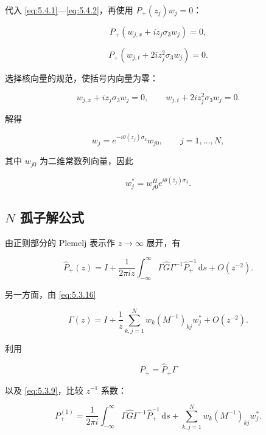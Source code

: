 \documentclass[
    lang=cn,
    scheme=chinese,
    mode=simple,
    device=normal,
    color=blue,
    math=cm,
    thmcnt=section,
    12pt,
    nowatermark
]{elegantbook}
\begin{document}
代入 \eqref{eq:5.4.1}---\eqref{eq:5.4.2}，再使用 $P_+(z_j)w_j=0$：

\[
    P_+\left(w_{j,x}+iz_j\sigma_3w_j\right)=0,
\]

\[
    P_+\left(w_{j,t}+2iz_j^2\sigma_3w_j\right)=0.
\]

选择核向量的规范，使括号内向量为零：

\[
    w_{j,x}+iz_j\sigma_3w_j=0,
    \qquad
    w_{j,t}+2iz_j^2\sigma_3w_j=0.
\]

解得

\begin{equation}
    w_j
    =
    e^{-i\theta(z_j)\sigma_3}w_{j0},
    \qquad
    j=1,\ldots,N,
    \tag{5.4.5}
    \label{eq:5.4.5}
\end{equation}

其中 $w_{j0}$ 为二维常数列向量，因此

\begin{equation}
    w_j^*
    =
    w_{j0}^He^{i\theta(\bar z_j)\sigma_3}.
    \tag{5.4.6}
    \label{eq:5.4.6}
\end{equation}

\subsection{\texorpdfstring{$N$}{N} 孤子解公式}

由正则部分的 Plemelj 表示作 $z\to\infty$ 展开，有

\begin{equation}
    \widehat P_+(z)
    =
    I+
    \dfrac{1}{2\pi iz}
    \int_{-\infty}^{\infty}
    \Gamma\widehat G\Gamma^{-1}\widehat P_+^{-1}\,\mathrm ds
    +
    O(z^{-2}).
    \tag{5.4.7}
    \label{eq:5.4.7}
\end{equation}

另一方面，由 \eqref{eq:5.3.16}

\begin{equation}
    \Gamma(z)
    =
    I+
    \dfrac{1}{z}
    \sum\limits_{k,j=1}^{N}
    w_k(M^{-1})_{kj}w_j^*
    +
    O(z^{-2}).
    \tag{5.4.8}
    \label{eq:5.4.8}
\end{equation}

利用

\[
    P_+=\widehat P_+\Gamma
\]

以及 \eqref{eq:5.3.9}，比较 $z^{-1}$ 系数：

\begin{equation}
    P_+^{(1)}
    =
    \dfrac{1}{2\pi i}
    \int_{-\infty}^{\infty}
    \Gamma\widehat G\Gamma^{-1}\widehat P_+^{-1}\,\mathrm ds
    +
    \sum\limits_{k,j=1}^{N}
    w_k(M^{-1})_{kj}w_j^*.
    \tag{5.4.9}
    \label{eq:5.4.9}
\end{equation}
\end{document}
